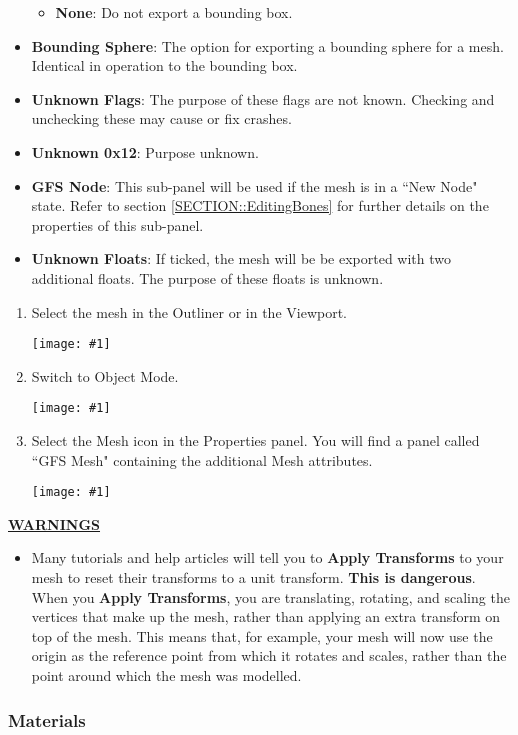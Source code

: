 \documentclass{article}
\newenvironment{guide}[1]
{
	\begin{center}
		\begin{tcolorbox}[%
			colback=black!20, 
			boxrule=0pt, 
			title=Step-by-step: #1,
			enhanced,
			breakable,
			overlay unbroken={%
                \draw[line width=1pt, black, rounded corners]
        	    (frame.north west) rectangle (frame.south east);
			},
    		overlay first={%
        		 \draw[line width=1pt, black, rounded corners]
        	    (frame.south west) -- (frame.north west) -- (frame.north east) -- (frame.south east);
                \draw[line width=1pt, black]
                (frame.south west) -- (frame.south east);
            },
    		overlay middle={%
                \draw[line width=1pt, black]
        	    (frame.north west) rectangle (frame.south east);
        	},
    		overlay last={%
                \draw[line width=1pt, black, rounded corners]
        	    (frame.north west) -- (frame.south west) -- (frame.south east) -- (frame.north east);
                \draw[line width=1pt, black]
                (frame.north west) -- (frame.north east);
           	}
        ]{}
    	\begin{enumerate}
}
{
    		\end{enumerate}
    	\end{tcolorbox}
	\end{center}  	 
}
\newcommand{\guideimage}[1]
{
	\begin{center}
		\texttt{[image: \#1]}
	\end{center}
}
\begin{document}
\begin{itemize}
\begin{itemize}
\item \textbf{None}: Do not export a bounding box.
\end{itemize}
\item \textbf{Bounding Sphere}: The option for exporting a bounding sphere for a mesh. Identical in operation to the bounding box.
\item \textbf{Unknown Flags}: The purpose of these flags are not known. Checking and unchecking these may cause or fix crashes.
\item \textbf{Unknown 0x12}: Purpose unknown.
\item \textbf{GFS Node}: This sub-panel will be used if the mesh is in a ``New Node" state. Refer to section \ref{SECTION::EditingBones} for further details on the properties of this sub-panel.
\item \textbf{Unknown Floats}: If ticked, the mesh will be be exported with two additional floats. The purpose of these floats is unknown.
\end{itemize}

\begin{guide}{Accessing Extra Mesh Attributes}
\item Select the mesh in the Outliner or in the Viewport.
\guideimage{images/editing_models/edits_select_mesh.png}
\item Switch to Object Mode.
\guideimage{images/editing_models/edits_to_object_mode.png}
\item Select the Mesh icon in the Properties panel. You will find a panel called ``GFS Mesh" containing the additional Mesh attributes.
\guideimage{images/editing_models/edits_mesh_properties.png}
\end{guide}

\underline{\textbf{WARNINGS}}
\begin{itemize}
\item Many tutorials and help articles will tell you to \textbf{Apply Transforms} to your mesh to reset their transforms to a unit transform. \textbf{This is dangerous}. When you \textbf{Apply Transforms}, you are translating, rotating, and scaling the vertices that make up the mesh, rather than applying an extra transform on top of the mesh. This means that, for example, your mesh will now use the origin as the reference point from which it rotates and scales, rather than the point around which the mesh was modelled.
\end{itemize}

\subsubsection{Materials}
\label{SECTION::EditingMaterials}
\end{document}
